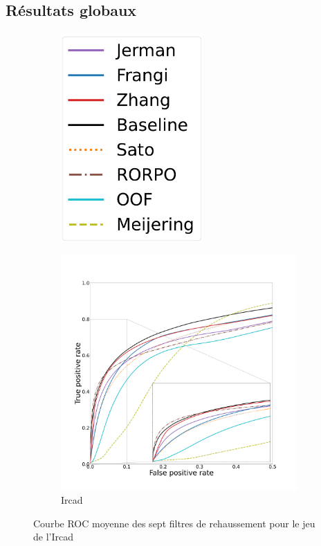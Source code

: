 \subsection{Résultats globaux}


\begin{figure}[!ht]
  \centering
  \begin{subfigure}[t]{\textwidth}
    \centering
    \includegraphics[clip = true, height=8cm]{Images/standAloneLegend.pdf}
  \end{subfigure}
\end{figure}
\begin{figure}[!ht]
  \begin{subfigure}[t]{\textwidth}
    \centering
  \includegraphics[clip = true, trim  =  125 125 180 260, height=9cm]{Images/Ircad_ROC.pdf}
  \caption{Ircad}
  \end{subfigure}
  \caption{Courbe ROC moyenne des sept filtres de rehaussement pour le jeu de l'Ircad}
  \label{fig:Ircad_ROC}
\end{figure}

